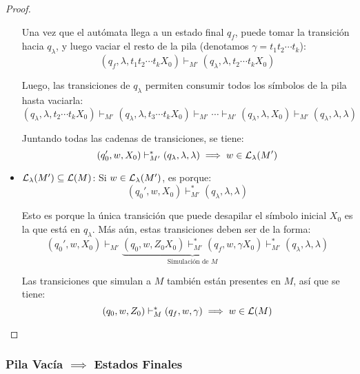 \begin{proof}
\begin{itemize}
        Una vez que el autómata llega a un estado final $q_f$, puede tomar la transición hacia $q_\lambda$, y luego vaciar el resto de la pila (denotamos $\gamma = t_1 t_2 \cdots t_k$):
        $$
            (q_f, \lambda, t_1 t_2 \cdots t_k X_0) \vdash_{M'} (q_\lambda, \lambda, t_2 \cdots t_k X_0)
        $$

        Luego, las transiciones de $q_\lambda$ permiten consumir todos los símbolos de la pila hasta vaciarla:
        $$
            (q_\lambda, \lambda, t_2 \cdots t_k X_0) \vdash_{M'} (q_\lambda, \lambda, t_3 \cdots t_k X_0) \vdash_{M'} \cdots \vdash_{M'} (q_\lambda, \lambda, X_0) \vdash_{M'} (q_\lambda, \lambda, \lambda)
        $$

        Juntando todas las cadenas de transiciones, se tiene:
        $$
            (q_0', w, X_0) \vdash_{M'}^* (q_\lambda, \lambda, \lambda) \implies w \in \mathcal{L}_\lambda(M')
        $$

        \item $\mathcal{L}_\lambda(M') \subseteq \mathcal{L}(M)$: Si $w \in \mathcal{L}_\lambda(M')$, es porque:
        $$
            (q_0', w, X_0) \vdash_{M'}^* (q_\lambda, \lambda, \lambda)
        $$

        Esto es porque la única transición que puede desapilar el símbolo inicial $X_0$ es la que está en $q_\lambda$. Más aún, estas transiciones deben ser de la forma:
        $$
            (q_0', w, X_0) \vdash_{M'} \underbrace{(q_0, w, Z_0 X_0) \vdash_{M'}^* (q_f, w, \gamma X_0)}_{\text{Simulación de } M} \vdash_{M'}^* (q_\lambda, \lambda, \lambda)
        $$

        Las transiciones que simulan a $M$ también están presentes en $M$, así que se tiene:
        $$
            (q_0, w, Z_0) \vdash_M^* (q_f, w, \gamma) \implies w \in \mathcal{L}(M)
        $$
    \end{itemize}
\end{proof}

\subsubsection{Pila Vacía $\implies$ Estados Finales}

